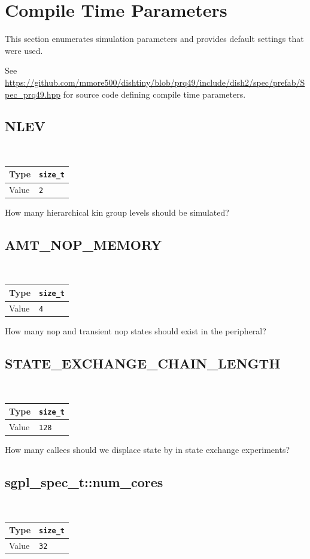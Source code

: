 \section{Compile Time Parameters}

\newcommand{\paramcompiletimedef}[2]{
    ~\\ \begin{tabularx}{\linewidth}{|
        >{\columncolor[HTML]{C0C0C0}}l |X|}
        \hline
        Type & \texttt{#1} \\ \hline
        Value   & \texttt{#2} \\ \hline
    \end{tabularx}
}

This section enumerates simulation parameters and provides default settings that were used.

See \url{https://github.com/mmore500/dishtiny/blob/prq49/include/dish2/spec/prefab/Spec_prq49.hpp} for source code defining compile time parameters.

\subsection{NLEV}

\paramcompiletimedef{size\_t}{2}

How many hierarchical kin group levels should be simulated?

\subsection{AMT\_NOP\_MEMORY}

\paramcompiletimedef{size\_t}{4}

How many nop and transient nop states should exist in the peripheral?

\subsection{STATE\_EXCHANGE\_CHAIN\_LENGTH}

\paramcompiletimedef{size\_t}{128}

How many callees should we displace state by in state exchange experiments?

\subsection{sgpl\_spec\_t::num\_cores}

\paramcompiletimedef{size\_t}{32}

